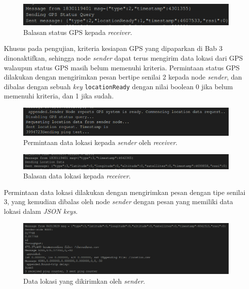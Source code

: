 \begin{figure}[H]
	\centering
	\includegraphics[scale=0.5]{./assets/RealisasiSistem/Sender/GPSQuery}
	\caption{Balasan status GPS kepada \textit{receiver}.}
\end{figure}
Khusus pada pengujian, kriteria kesiapan GPS yang dipaparkan di Bab 3 dinonaktifkan, sehingga node \textit{sender} dapat terus mengirim data lokasi dari GPS walaupun status GPS masih belum memenuhi kriteria. Permintaan status GPS dilakukan dengan mengirimkan pesan bertipe senilai 2 kepada node \textit{sender}, dan dibalas dengan sebuah \textit{key} \verb|locationReady| dengan nilai boolean 0 jika belum memenuhi kriteria, dan 1 jika sudah.
\begin{figure}[H]
	\centering
	\includegraphics[scale=0.5]{./assets/RealisasiSistem/FlyingReceiver/LocationRequest}
	\caption{Permintaan data lokasi kepada \textit{sender} oleh \textit{receiver}.}
\end{figure}
\begin{figure}[H]
	\centering
	\includegraphics[scale=0.5]{./assets/RealisasiSistem/Sender/LocationRequest}
	\caption{Balasan data lokasi kepada \textit{receiver}.}
\end{figure}
Permintaan data lokasi dilakukan dengan mengirimkan pesan dengan tipe senilai 3, yang kemudian dibalas oleh node \textit{sender} dengan pesan yang memiliki data lokasi dalam \textit{JSON keys}.
\begin{figure}[H]
	\centering
	\includegraphics[scale=0.5]{./assets/RealisasiSistem/FlyingReceiver/DataLokasi}
	\caption{Data lokasi yang dikirimkan oleh \textit{sender}.}
\end{figure}
